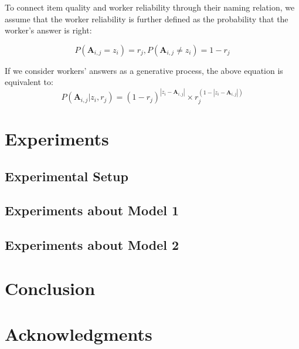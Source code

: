 \documentclass{article}
\begin{document}
To connect item quality and worker reliability through their naming relation, we assume that the worker reliability is further defined as the probability that the worker's answer is right:

\begin{equation}
    P(\mathbf{A}_{i,j} = z_i) =  r_j, P(\mathbf{A}_{i,j} \ne z_i) = 1- r_j
    \label{eq:item_worker_rel}
\end{equation}

If we consider workers' answers as a generative process, the above equation is equivalent to:
\begin{equation}
    P(\mathbf{A}_{i,j} | z_i,  r_j) = (1- r_j)^{|z_i-\mathbf{A}_{i,j}|}\times  r_j^{(1-|z_i-\mathbf{A}_{i,j}|)}
    \label{eq:item_worker}
\end{equation}



\section{Experiments}

\subsection{Experimental Setup}

\subsection{Experiments about Model 1}

\subsection{Experiments about Model 2}

\section{Conclusion}



\section*{Acknowledgments}





\end{document}

